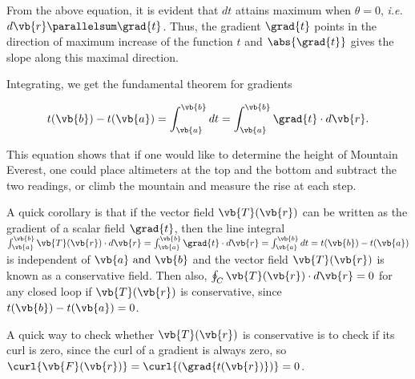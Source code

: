 \documentclass[english,a4paper,12pt]{report}
\begin{document}
From the above equation, it is evident that \(dt\) attains maximum when \(\theta = 0\), \textit{i.e.} \(d\vb{r} \parallelsum \grad{t}\). Thus, the gradient \(\grad{t}\) points in the direction of maximum increase of the function \(t\) and \(\abs{\grad{t}}\) gives the slope along this maximal direction.


	
Integrating, we get the fundamental theorem for gradients

\begin{equation} 
	t(\vb{b}) - t(\vb{a}) = \int_{\vb{a} }^{\vb{b} } dt = \int_{\vb{a}}^{\vb{b}} \grad{t} \cdot d\vb{r}. 
\end{equation}
	
This equation shows that if one would like to determine the height of Mountain Everest, one could place altimeters at the top and the bottom and subtract the two readings, or climb the mountain and measure the rise at each step.

A quick corollary is that if the vector field \(\vb{T} (\vb{r} )\) can be written as the gradient of a scalar field \(\grad{t}  \), then the line integral \(\int_{\vb{a} }^{\vb{b} } \vb{T}(\vb{r} ) \cdot  d\vb{r}  = \int_{\vb{a} }^{\vb{b} } \grad{t} \cdot d\vb{r} = \int_{\vb{a} }^{\vb{b} }dt = t(\vb{b} ) - t(\vb{a} )\) is independent of \(\vb{a} \text { and } \vb{b} \) and the vector field \(\vb{T} (\vb{r} )\) is known as a conservative field. Then also, \(\oint_{C} \vb{T} (\vb{r} ) \cdot d\vb{r} = 0\) for any closed loop if \(\vb{T} (\vb{r} )\) is conservative, since \(t(\vb{b}) - t(\vb{a}) = 0\). 

A quick way to check whether \(\vb{T} (\vb{r} )\) is conservative is to check if its curl is zero, since the curl of a gradient is always zero, so \(\curl{\vb{F} (\vb{r} )} = \curl{(\grad{t(\vb{r} )} )} =0 \).  
\end{document}
